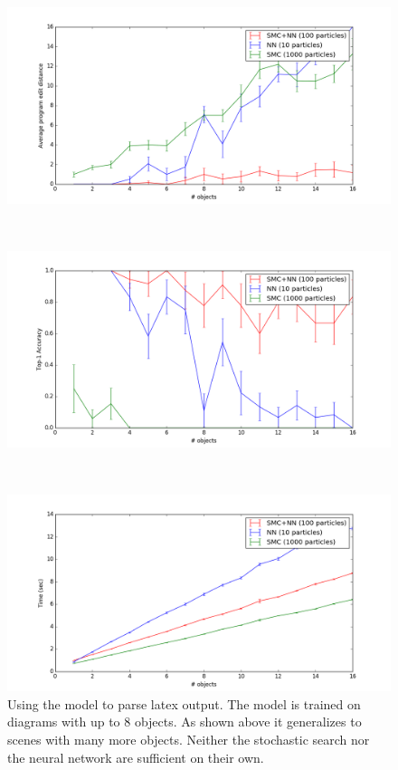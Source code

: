 \documentclass{article}
\begin{document}
\begin{figure}
  \begin{minipage}[t]{15cm}
    \includegraphics[width = 15cm]{figures/editDistance.png}
  \end{minipage}\\
  \begin{minipage}[t]{15cm}
    \includegraphics[width = 15cm]{figures/accuracy.png}
  \end{minipage}\\
  \begin{minipage}[t]{15cm}
    \includegraphics[width = 15cm]{figures/time.png}
  \end{minipage}
  \caption{Using the model to parse latex output. The model is trained on diagrams with up to 8 objects. As shown above it generalizes to scenes with many more objects. Neither the stochastic search nor the neural network are sufficient on their own.}\label{syntheticResults}
\end{figure}
\end{document}
